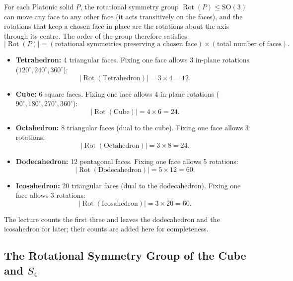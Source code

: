\begin{content}
\begin{steps}
For each Platonic solid $P$, the rotational symmetry group $\operatorname{Rot}(P) \le \mathrm{SO}(3)$ can move any face to any other face (it acts transitively on the faces), and the rotations that keep a chosen face in place are the rotations about the axis through its centre. The order of the group therefore satisfies:
\[
|\operatorname{Rot}(P)| = (\text{rotational symmetries preserving a chosen face}) \times (\text{total number of faces}).
\]
\begin{itemize}
    \item \textbf{Tetrahedron:} 4 triangular faces. Fixing one face allows 3 in-plane rotations ($120^\circ, 240^\circ, 360^\circ$):
    \[
    |\operatorname{Rot}(\text{Tetrahedron})| = 3 \times 4 = 12.
    \]
    \item \textbf{Cube:} 6 square faces. Fixing one face allows 4 in-plane rotations ($90^\circ, 180^\circ, 270^\circ, 360^\circ$):
    \[
    |\operatorname{Rot}(\text{Cube})| = 4 \times 6 = 24.
    \]
    \item \textbf{Octahedron:} 8 triangular faces (dual to the cube). Fixing one face allows 3 rotations:
    \[
    |\operatorname{Rot}(\text{Octahedron})| = 3 \times 8 = 24.
    \]
    \item \textbf{Dodecahedron:} 12 pentagonal faces. Fixing one face allows 5 rotations:
    \[
    |\operatorname{Rot}(\text{Dodecahedron})| = 5 \times 12 = 60.
    \]
    \item \textbf{Icosahedron:} 20 triangular faces (dual to the dodecahedron). Fixing one face allows 3 rotations:
    \[
    |\operatorname{Rot}(\text{Icosahedron})| = 3 \times 20 = 60.
    \]
\end{itemize}
The lecture counts the first three and leaves the dodecahedron and the icosahedron for later; their counts are added here for completeness.
\end{steps}
\end{content}

\subsection{The Rotational Symmetry Group of the Cube and \texorpdfstring{$S_4$}{S4}}

